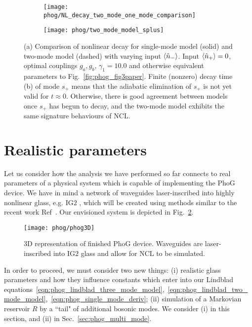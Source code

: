 \begin{figure}[htp]
\captionsetup{width=0.8\linewidth}
\centering
	\begin{subfigure}{0.7\linewidth}
	\caption{}
	\texttt{[image: phog/NL\_decay\_two\_mode\_one\_mode\_comparison]}
	\end{subfigure}
	\begin{subfigure}{0.7\linewidth}
	\centering
	\caption{}
	\texttt{[image: phog/two\_mode\_model\_splus]}
	\end{subfigure}
\caption{\label{fig:phog_two_mode_single_mode_comparison} (a) Comparison of nonlinear decay for single-mode model (solid) and two-mode model (dashed) with varying input $\ev{\hat{n}_-}$. Input $\ev{\hat{n}_+} = 0$, optimal couplings $g_a, g_b$, $\gamma_1 = 10.0$ and otherwise equivalent parameters to Fig.~\ref{fig:phog_fig3paper}. Finite (nonzero) decay time (b) of mode $s_+$ means that the adiabatic elimination of $s_+$ is not yet valid for $t \approx 0$. Otherwise, there is good agreement between models once $s_+$ has begun to decay, and the two-mode model exhibits the same signature behaviours of NCL.}
\end{figure}

\clearpage
\section{Realistic parameters}\label{sec:parameters}

Let us consider how the analysis we have performed so far connects to real parameters of a physical system which is capable of implementing the PhoG device. We have in mind a network of waveguides laser-inscribed into highly nonlinear glass, e.g. IG$2$ \cite{ig2}, which will be created using methods similar to the recent work Ref~\cite{Mukherjee2017}. Our envisioned system is depicted in Fig.~\ref{fig:phog_realistic}.

\begin{figure}[htp]
\captionsetup{width=0.8\linewidth}
\centering
\texttt{[image: phog/phog3D]}
\caption{\label{fig:phog_realistic} $3$D representation of finished PhoG device. Waveguides are laser-inscribed into IG$2$ glass and allow for NCL to be simulated.}
\end{figure}

In order to proceed, we must consider two new things: (i) realistic glass parameters and how they influence constants which enter into our Lindblad equations~\ref{eqn:phog_lindblad_three_mode_model},~\ref{eqn:phog_lindblad_two_mode_model},~\ref{eqn:phog_single_mode_deriv}; (ii) simulation of a Markovian reservoir $R$ by a ``tail" of additional bosonic modes. We consider (i) in this section, and (ii) in Sec.~\ref{sec:phog_multi_mode}.

